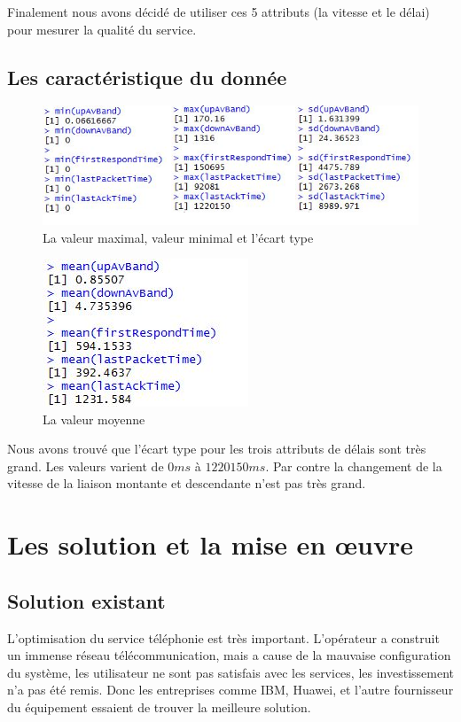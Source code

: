 Finalement nous avons décidé de utiliser ces 5 attributs (la vitesse et le délai) pour mesurer la qualité du service.

\subsection{Les caractéristique du donnée}



\begin{figure}[H]
\centering
\includegraphics[width=0.9\linewidth, height=0.3\textheight]{images/max-min}
\caption{La valeur maximal, valeur minimal et l'écart type}
\label{fig:max-min}
\end{figure}

\begin{figure}[H]
\centering
\includegraphics[width=0.4\linewidth]{images/mean}
\caption{La valeur moyenne}
\label{fig:mean}
\end{figure}

Nous avons trouvé que l'écart type pour les trois attributs de délais sont très grand. Les valeurs varient de $0ms$ à $1220150ms$. 
 Par contre la changement  de la vitesse de la liaison montante et descendante n'est pas très grand.


\section{Les solution et la mise en \oe uvre}
\subsection{Solution existant}     
L'optimisation du service téléphonie est très important. L'opérateur a construit un immense réseau télécommunication, mais a cause de la mauvaise configuration du système, les utilisateur ne sont pas satisfais avec les services, les investissement n'a pas été remis. Donc les entreprises comme IBM, Huawei, et l'autre fournisseur du équipement essaient de trouver la meilleure solution. 

